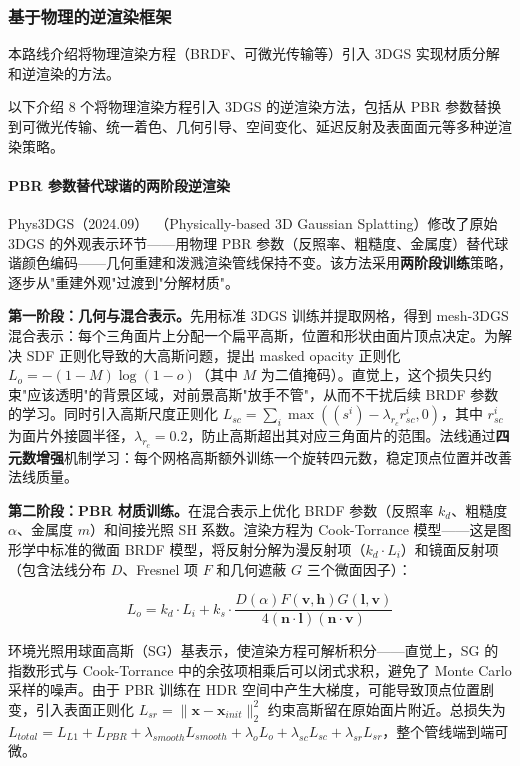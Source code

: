 \subsubsection{基于物理的逆渲染框架}

本路线介绍将物理渲染方程（BRDF、可微光传输等）引入 3DGS 实现材质分解和逆渲染的方法。

以下介绍 8 个将物理渲染方程引入 3DGS 的逆渲染方法，包括从 PBR 参数替换到可微光传输、统一着色、几何引导、空间变化、延迟反射及表面面元等多种逆渲染策略。

\paragraph{PBR 参数替代球谐的两阶段逆渲染}

Phys3DGS（2024.09）~\cite{2409_10335}（Physically-based 3D Gaussian Splatting）修改了原始 3DGS 的外观表示环节——用物理 PBR 参数（反照率、粗糙度、金属度）替代球谐颜色编码——几何重建和泼溅渲染管线保持不变。该方法采用\textbf{两阶段训练}策略，逐步从"重建外观"过渡到"分解材质"。

\textbf{第一阶段：几何与混合表示。}先用标准 3DGS 训练并提取网格，得到 mesh-3DGS 混合表示：每个三角面片上分配一个扁平高斯，位置和形状由面片顶点决定。为解决 SDF 正则化导致的大高斯问题，提出 masked opacity 正则化 $L_o = -(1 - M) \log(1 - o)$（其中 $M$ 为二值掩码）。直觉上，这个损失只约束"应该透明"的背景区域，对前景高斯"放手不管"，从而不干扰后续 BRDF 参数的学习。同时引入高斯尺度正则化 $L_{sc} = \sum_i \max((s^i) - \lambda_{r_c} r^i_{sc}, 0)$，其中 $r^i_{sc}$ 为面片外接圆半径，$\lambda_{r_c} = 0.2$，防止高斯超出其对应三角面片的范围。法线通过\textbf{四元数增强}机制学习：每个网格高斯额外训练一个旋转四元数，稳定顶点位置并改善法线质量。

\textbf{第二阶段：PBR 材质训练。}在混合表示上优化 BRDF 参数（反照率 $k_d$、粗糙度 $\alpha$、金属度 $m$）和间接光照 SH 系数。渲染方程为 Cook-Torrance 模型——这是图形学中标准的微面 BRDF 模型，将反射分解为漫反射项（$k_d \cdot L_i$）和镜面反射项（包含法线分布 $D$、Fresnel 项 $F$ 和几何遮蔽 $G$ 三个微面因子）：

\begin{equation}
L_o = k_d \cdot L_i + k_s \cdot \frac{D(\alpha) F(\mathbf{v}, \mathbf{h}) G(\mathbf{l}, \mathbf{v})}{4 (\mathbf{n} \cdot \mathbf{l})(\mathbf{n} \cdot \mathbf{v})}
\end{equation}

环境光照用球面高斯（SG）基表示，使渲染方程可解析积分——直觉上，SG 的指数形式与 Cook-Torrance 中的余弦项相乘后可以闭式求积，避免了 Monte Carlo 采样的噪声。由于 PBR 训练在 HDR 空间中产生大梯度，可能导致顶点位置剧变，引入表面正则化 $L_{sr} = \|\mathbf{x} - \mathbf{x}_{init}\|_2^2$ 约束高斯留在原始面片附近。总损失为 $L_{total} = L_{L1} + L_{PBR} + \lambda_{smooth} L_{smooth} + \lambda_o L_o + \lambda_{sc} L_{sc} + \lambda_{sr} L_{sr}$，整个管线端到端可微。

